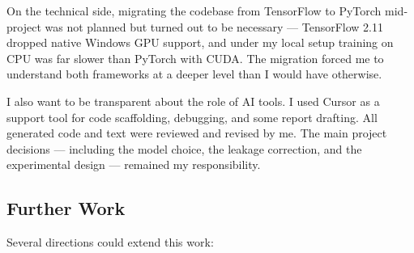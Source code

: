 On the technical side, migrating the codebase from TensorFlow to PyTorch mid-project was not planned but turned out to be necessary --- TensorFlow 2.11 dropped native Windows GPU support, and under my local setup training on CPU was far slower than PyTorch with CUDA. The migration forced me to understand both frameworks at a deeper level than I would have otherwise.

I also want to be transparent about the role of AI tools. I used Cursor as a support tool for code scaffolding, debugging, and some report drafting. All generated code and text were reviewed and revised by me. The main project decisions --- including the model choice, the leakage correction, and the experimental design --- remained my responsibility.

\subsection{Further Work}

Several directions could extend this work:

